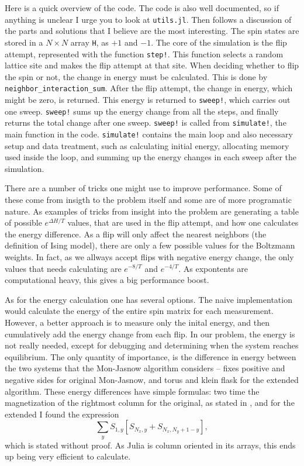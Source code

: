 \documentclass[12pt, a4paper]{article}
\begin{document}
Here is a quick overview of the code.
The code is also well documented, so if anything is unclear I urge you to look at \verb|utils.jl|.
Then follows a discussion of the parts and solutions that I believe are the most interesting.
The spin states are stored in a $N \times N$ array \verb|H|, as $+1$ and $-1$.
The core of the simulation is the flip attempt, represented with the function \verb|step!|.
This function selects a random lattice site and makes the flip attempt at that site.
When deciding whether to flip the spin or not, the change in energy must be calculated.
This is done by \verb|neighbor_interaction_sum|.
After the flip attempt, the change in energy, which might be zero, is returned.
This energy is returned to \verb|sweep!|, which carries out one sweep.
\verb|sweep!| sums up the energy change from all the steps, and finally returns the total change after one sweep.
\verb|sweep!| is called from \verb|simulate!|, the main function in the code.
\verb|simulate!| contains the main loop and also necessary setup and data treatment, such as calculating initial energy, allocating memory used inside the loop, and summing up the energy changes in each sweep after the simulation.


There are a number of tricks one might use to improve performance.
Some of these come from insigth to the problem itself and some are of more programatic nature.
As examples of tricks from insight into the problem are generating a table of possible $e^{\Delta H/T}$ values, that are used in the flip attempt, and how one calculates the energy difference.
As a flip will only affect the nearest neighbors (the definition of Ising model), there are only a few possible values for the Boltzmann weights.
In fact, as we allways accept flips with negative energy change, the only values that needs calculating are $e^{-8/T}$ and $e^{-4/T}$.
As expontents are computational heavy, this gives a big performance boost.


As for the energy calculation one has several options.
The naive implementation would calculate the energy of the entire spin matrix for each measurement.
However, a better approach is to measure only the inital energy, and then cumulatively add the energy change from each flip.
In our problem, the energy is not really needed, except for debugging and determining when the system reaches equilibrium.
The only quantity of importance, is the difference in energy between the two systems that the Mon-Jasnow algorithm considers -- fixes positive and negative sides for original Mon-Jasnow, and torus and klein flask for the extended algorithm.
These energy differences have simple formulas: two time the magnetization of the rightmost column for the original, as stated in \cite{mon_jasnow}, and for the extended I found the expression
\begin{equation}
  \sum_y S_{1,y} [ S_{N_x, y} + S_{N_x, N_y+1-y} ],
\end{equation}
which is stated without proof.
As Julia is column oriented in its arrays, this ends up being very efficient to calculate.
\end{document}
